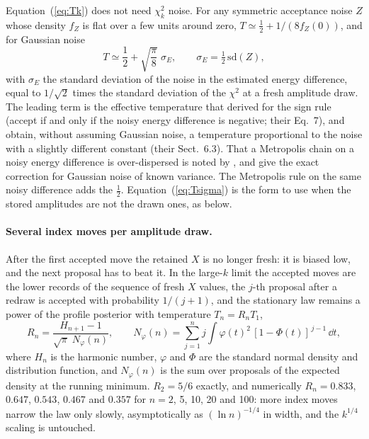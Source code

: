 Equation~(\ref{eq:Tk}) does not need $\chi^2_k$ noise. For any symmetric acceptance noise $Z$ whose
density $f_Z$ is flat over a few units around zero, $T \simeq \tfrac12 + 1/(8 f_Z(0))$, and for Gaussian noise
\begin{equation}
  T \simeq \frac12 + \sqrt{\frac{\pi}{8}}\; \sigma_E , \qquad \sigma_E = \tfrac12\,\mathrm{sd}(Z) ,
  \label{eq:Tsigma}
\end{equation}
with $\sigma_E$ the standard deviation of the noise in the estimated energy difference, equal to
$1/\sqrt2$ times the standard deviation of the $\chi^2$ at a fresh amplitude draw. The leading term
is the effective temperature that \citet{ball2003} derived for the sign rule (accept if and only if
the noisy energy difference is negative; their Eq.~7), and \citet{bardenet2017} obtain, without assuming Gaussian noise, a
temperature proportional to the noise with a slightly different constant (their Sect.~6.3). That a
Metropolis chain on a noisy energy difference is over-dispersed is noted by \citet{nicholls2012}, and
\citet{ceperley1999} give the exact correction for Gaussian noise of known variance. The Metropolis rule on the same noisy difference adds the
$\tfrac12$. Equation~(\ref{eq:Tsigma}) is the form to use when the stored amplitudes are not the drawn
ones, as below.

\paragraph{Several index moves per amplitude draw.} After the first accepted move the retained $X$ is
no longer fresh: it is biased low, and the next proposal has to beat it. In the large-$k$ limit the
accepted moves are the lower records of the sequence of fresh $X$ values, the $j$-th proposal after a
redraw is accepted with probability $1/(j+1)$, and the stationary law remains a power of the profile
posterior with temperature $T_n = R_n T_1$,
\begin{equation}
  R_n = \frac{H_{n+1} - 1}{\sqrt{\pi}\; N_\varphi(n)} , \qquad
  N_\varphi(n) = \sum_{j=1}^{n} j \int \varphi(t)^2\, [1 - \Phi(t)]^{\,j-1}\, \dd t ,
  \label{eq:Rn}
\end{equation}
where $H_n$ is the harmonic number, $\varphi$ and $\Phi$ are the standard normal density and distribution
function, and $N_\varphi(n)$ is the sum over proposals of the expected density at the running minimum.
$R_2 = 5/6$ exactly, and numerically
$R_n = 0.833$, $0.647$, $0.543$, $0.467$ and $0.357$ for $n = 2$, 5, 10, 20 and 100: more index
moves narrow the law only slowly, asymptotically as $(\ln n)^{-1/4}$ in width, and the $k^{1/4}$
scaling is untouched.

